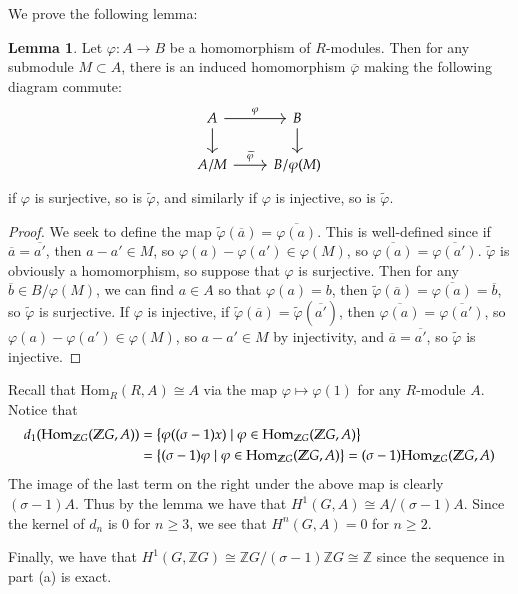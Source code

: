 \documentclass[12pt]{article}
\theoremstyle{definition}
\newtheorem{lemma}{Lemma}
\theoremstyle{definitionstyle}
\def\mbb#1{\mathbb{#1}}
\def\cph{\varphi}
\newcommand{\SET}[1]{\Set{\mskip-\medmuskip #1 \mskip-\medmuskip}}
\newcommand{\Z}{\mbb Z}
\newcommand{\Hom}{\mathrm{Hom}}
\begin{document}
\begin{enumerate}[label=(\alph*)]
        We prove the following lemma:
        \begin{lemma}
            Let $\cph: A \to B$ be a homomorphism of $R$-modules. Then for any submodule $M \subset A$, there is an induced homomorphism $\overline \cph$ making the following diagram commute:
            \[\begin{tikzcd}
                A & B \\
                {A/M} & {B/\cph(M)}
                \arrow["\cph", from=1-1, to=1-2]
                \arrow[from=1-1, to=2-1]
                \arrow[from=1-2, to=2-2]
                \arrow["{\widetilde \cph}", from=2-1, to=2-2]
            \end{tikzcd}\]
            if $\cph$ is surjective, so is $\widetilde \cph$, and similarly if $\cph$ is injective, so is $\widetilde \cph$.
        \end{lemma}
        \begin{proof}
            We seek to define the map $\widetilde \cph(\overline a) = \overline{\cph(a)}$. This is well-defined since if $\overline a = \overline{a'}$, then $a - a' \in M$, so $\cph(a) - \cph(a') \in \cph(M)$, so $\overline{\cph(a)} = \overline{\cph(a')}$. $\widetilde \cph$ is obviously a homomorphism, so suppose that $\cph$ is surjective. Then for any $\overline b \in B/\cph(M)$, we can find $a \in A$ so that $\cph(a) = b$, then $\widetilde \cph(\overline a) = \overline{\cph(a)} = \overline b$, so $\widetilde \cph$ is surjective. If $\cph$ is injective, if $\widetilde \cph(\overline a) = \widetilde \cph(\overline{a'})$, then $\overline{\cph(a)} = \overline{\cph(a')}$, so $\cph(a) - \cph(a') \in \cph(M)$, so $a - a' \in M$ by injectivity, and $\overline a = \overline{a'}$, so $\widetilde \cph$ is injective.
        \end{proof}
        Recall that $\Hom_R(R, A) \cong A$ via the map $\cph \mapsto \cph(1)$ for any $R$-module $A$. Notice that 
        \begin{align*}
            d_1(\Hom_{\Z G}(\Z G, A)) &= \SET{\cph((\sigma-1)x) \mid \cph \in \Hom_{\Z G}(\Z G, A)} 
            \\&= \SET{(\sigma-1)\cph \mid \cph \in \Hom_{\Z G}(\Z G, A)} = (\sigma-1)\Hom_{\Z G}(\Z G, A)
        \end{align*}
        The image of the last term on the right under the above map is clearly $(\sigma-1)A$. Thus by the lemma we have that $H^1(G, A) \cong A/(\sigma-1)A$. Since the kernel of $d_n$ is 0 for $n \geq 3$, we see that $H^n(G, A) = 0$ for $n \geq 2$.
        
        Finally, we have that $H^1(G, \Z G) \cong \Z G / (\sigma-1) \Z G \cong \Z$ since the sequence in part (a) is exact.
    \end{enumerate}
\end{document}

